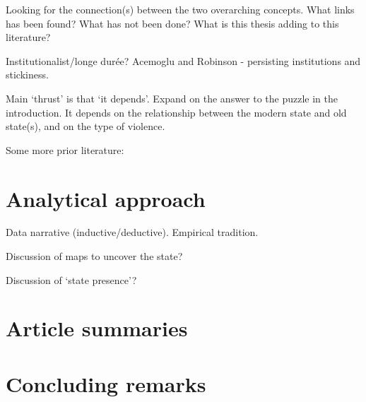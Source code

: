 \documentclass[12pt]{article}
\begin{document}
Looking for the connection(s) between the two overarching concepts. What links
has been found? What has not been done? What is this thesis adding to this
literature? 

Institutionalist/longe durée? Acemoglu and Robinson - persisting institutions
and stickiness.

Main `thrust' is that `it depends'. Expand on the answer to the puzzle in the
introduction. It depends on the relationship between the modern state and old
state(s), and on the type of violence.

Some more prior literature: \citet{Griffiths2016} \citet{Ahram2019}

\section{Analytical approach} \label{Analytical approach}

Data narrative (inductive/deductive). Empirical tradition.

Discussion of maps to uncover the state?

Discussion of `state presence'?

\section{Article summaries} \label{Article summaries}

\section{Concluding remarks} \label{Concluding remarks}

\pagebreak



\end{document}
